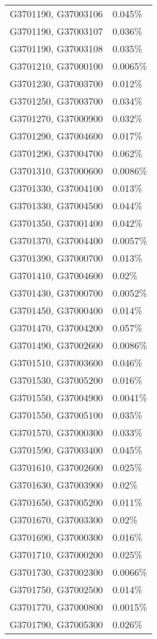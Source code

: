 \begin{longtable}[]{@{}ll@{}}
G3701190, G37003106 & 0.045\% \\
G3701190, G37003107 & 0.036\% \\
G3701190, G37003108 & 0.035\% \\
G3701210, G37000100 & 0.0065\% \\
G3701230, G37003700 & 0.012\% \\
G3701250, G37003700 & 0.034\% \\
G3701270, G37000900 & 0.032\% \\
G3701290, G37004600 & 0.017\% \\
G3701290, G37004700 & 0.062\% \\
G3701310, G37000600 & 0.0086\% \\
G3701330, G37004100 & 0.013\% \\
G3701330, G37004500 & 0.044\% \\
G3701350, G37001400 & 0.042\% \\
G3701370, G37004400 & 0.0057\% \\
G3701390, G37000700 & 0.013\% \\
G3701410, G37004600 & 0.02\% \\
G3701430, G37000700 & 0.0052\% \\
G3701450, G37000400 & 0.014\% \\
G3701470, G37004200 & 0.057\% \\
G3701490, G37002600 & 0.0086\% \\
G3701510, G37003600 & 0.046\% \\
G3701530, G37005200 & 0.016\% \\
G3701550, G37004900 & 0.0041\% \\
G3701550, G37005100 & 0.035\% \\
G3701570, G37000300 & 0.033\% \\
G3701590, G37003400 & 0.045\% \\
G3701610, G37002600 & 0.025\% \\
G3701630, G37003900 & 0.02\% \\
G3701650, G37005200 & 0.011\% \\
G3701670, G37003300 & 0.02\% \\
G3701690, G37000300 & 0.016\% \\
G3701710, G37000200 & 0.025\% \\
G3701730, G37002300 & 0.0066\% \\
G3701750, G37002500 & 0.014\% \\
G3701770, G37000800 & 0.0015\% \\
G3701790, G37005300 & 0.026\% \\

\end{longtable}
